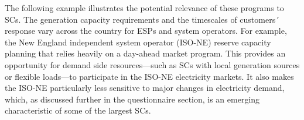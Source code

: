 
The following example illustrates the potential relevance of these programs to SCs.
The generation capacity requirements and the timescales of customers´ response vary across the country for ESPs and system operators. For example, the New England independent system operator (ISO-NE) reserve capacity planning that relies heavily on a day-ahead market program. This provides an opportunity for demand side resources---such as SCs with local generation sources or flexible loads---to participate in the ISO-NE electricity markets. It also makes the ISO-NE particularly less sensitive to major changes in electricity demand, which, as discussed further in the questionnaire section, is an emerging characteristic of some of the largest SCs.